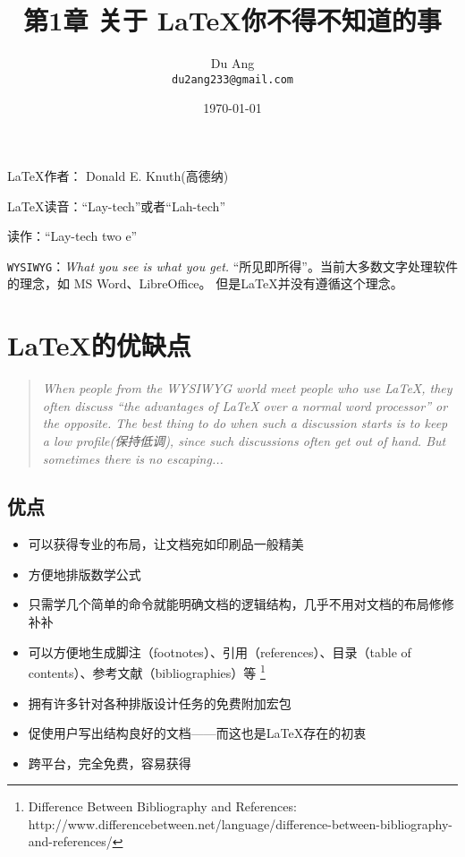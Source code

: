 \documentclass[UTF8]{ctexart}
\title{\heiti 第1章 \quad 关于 \LaTeX 你不得不知道的事}
\author{\kaishu Du Ang \\ \texttt{du2ang233@gmail.com} }
\date{\today}
\begin{document}
\maketitle

\tableofcontents

\newpage

\LaTeX 作者： Donald E. Knuth(高德纳)

\LaTeX 读音：“Lay-tech”或者“Lah-tech”

\LaTeXe 读作：“Lay-tech two e”

\texttt{WYSIWYG}：\emph{What you see is what you get.} “所见即所得”。当前大多数文字处理软件的理念，如 MS Word、LibreOffice。
但是\LaTeX 并没有遵循这个理念。

\section{\LaTeX 的优缺点}
\begin{quotation}
    \emph{ When people from the WYSIWYG world meet people who use \LaTeX, they
    often discuss “the advantages of \LaTeX{} over a normal word processor” or the
    opposite. The best thing to do when such a discussion starts is to keep a low
    profile(保持低调), since such discussions often get out of hand. But sometimes there is
    no escaping... }
\end{quotation}
\subsection{优点}
\begin{itemize}
    \item 可以获得专业的布局，让文档宛如印刷品一般精美
    \item 方便地排版数学公式
    \item 只需学几个简单的命令就能明确文档的逻辑结构，几乎不用对文档的布局修修补补
    \item 可以方便地生成脚注（footnotes）、引用（references）、目录（table of contents）、参考文献（bibliographies）等
            \footnote{Difference Between Bibliography and References:
            http://www.differencebetween.net/language/difference-between-bibliography-and-references/}
    \item 拥有许多针对各种排版设计任务的免费附加宏包
    \item 促使用户写出结构良好的文档——而这也是\LaTeX 存在的初衷
    \item 跨平台，完全免费，容易获得
\end{itemize}
\end{document}
